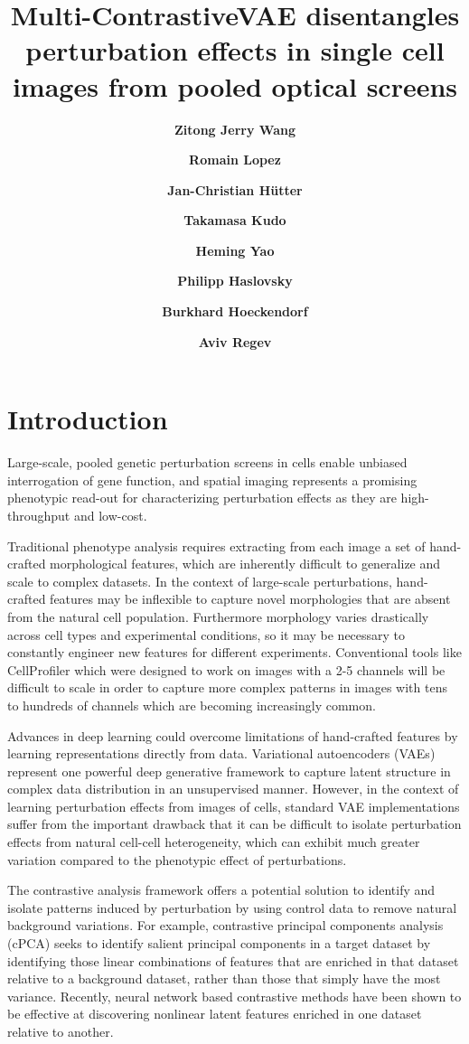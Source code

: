 \documentclass{article}
\title{Multi-ContrastiveVAE disentangles perturbation effects in single cell images from pooled optical screens}
\author[1]{\textbf{Zitong Jerry Wang}}
\author[2]{\textbf{Romain Lopez}}
\author[2]{\textbf{Jan-Christian Hütter}}
\author[2]{\textbf{Takamasa Kudo}}
\author[2]{\textbf{Heming Yao}}
\author[2]{\textbf{Philipp Haslovsky}}
\author[2]{\textbf{Burkhard Hoeckendorf}}
\author[2]{\textbf{Aviv Regev}}
\affil[1]{California Institute of Technology}
\affil[2]{Genentech Research and Early Development}
\begin{document}
\maketitle


\begin{abstract}
  
\end{abstract}


\section*{Introduction}
Large-scale, pooled genetic perturbation screens in cells enable unbiased interrogation of gene function, and spatial imaging represents a promising phenotypic read-out for characterizing perturbation effects as they are high-throughput and low-cost.

Traditional phenotype analysis requires extracting from each image a set of hand-crafted morphological features, which are inherently difficult to generalize and scale to complex datasets.
In the context of large-scale perturbations, hand-crafted features may be inflexible to capture novel morphologies that are absent from the natural cell population. Furthermore morphology varies drastically across cell types and experimental conditions, so it may be necessary to constantly engineer new features for different experiments.
Conventional tools like CellProfiler which were designed to work on images with a 2-5 channels will be difficult to scale in order to capture more complex patterns in images with tens to hundreds of channels which are becoming increasingly common.

Advances in deep learning could overcome limitations of hand-crafted features by learning representations directly from data. Variational autoencoders (VAEs) represent one powerful deep generative framework to capture latent structure in complex data distribution in an unsupervised manner. However, in the context of learning perturbation effects from images of cells, standard VAE implementations suffer from the important drawback that it can be difficult to isolate perturbation effects from natural cell-cell heterogeneity, which can exhibit much greater variation compared to the phenotypic effect of perturbations.

The contrastive analysis framework offers a potential solution to identify and isolate patterns induced by perturbation by using control data to remove natural background variations. For example, contrastive principal components analysis (cPCA) seeks to identify salient principal components in a target dataset by identifying those linear combinations of features that are enriched in that dataset relative to a background dataset, rather than those that simply have the most variance. Recently, neural network based contrastive methods have been shown to be effective at discovering nonlinear latent features enriched in one dataset relative to another.
\end{document}
